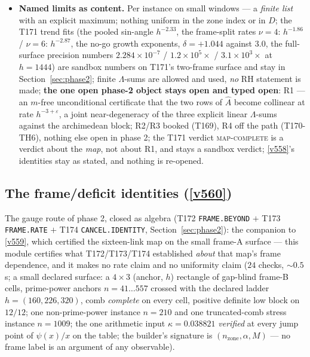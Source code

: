 \documentclass[11pt,a4paper]{article}
\begin{document}
\begin{itemize}[leftmargin=1.5em]
wrong Thomson entry, the off-by-one swap, the wrong polarisation coefficient --- the
$10^{-2}$ bar missed by orders).
\item \textbf{Named limits as content.} Per instance on small windows --- a \emph{finite
list} with an explicit maximum; nothing uniform in the zone index or in $D$; the T171
trend fits (the pooled sin-angle $h^{-2.33}$, the frame-split rates $\nu=4$:
$h^{-1.86}$ / $\nu=6$: $h^{-2.87}$, the no-go growth exponents, $\delta=+1.044$ against
$3.0$, the full-surface precision numbers $2.284\times10^{-7}$ / $1.2\times10^{5}\times$
/ $3.1\times10^{3}\times$ at $h=1444$) are sandbox numbers on T171's two-frame surface
and stay in Section~\ref{sec:phase2}; finite $\Lambda$-sums are allowed and used,
\emph{no} RH statement is made; \textbf{the one open phase-2 object stays open and typed
open}: R1 --- an $m$-free unconditional certificate that the two rows of $\hat A$ become
collinear at rate $h^{-3+\varepsilon}$, a joint near-degeneracy of the three explicit
linear $\Lambda$-sums against the archimedean block; R2/R3 booked (T169), R4 off the
path (T170-TH6), nothing else open in phase 2; the T171 verdict \textsc{map-complete}
is a verdict about the \emph{map}, not about R1, and stays a sandbox verdict;
\vref{v558}'s identities stay as stated, and nothing is re-opened.
\end{itemize}

\subsection{The frame/deficit identities (\texorpdfstring{\vref{v560}}{v560})}\label{sec:v560}
The gauge route of phase 2, closed as algebra (T172 \texttt{FRAME.BEYOND} $+$ T173
\texttt{FRAME.RATE} $+$ T174 \texttt{CANCEL.IDENTITY}, Section~\ref{sec:phase2}): the
companion to \vref{v559}, which certified the sixteen-link map on the small frame-A
surface --- this module certifies what T172/T173/T174 established \emph{about} that map's
frame dependence, and it makes no rate claim and no uniformity claim
 ($24$ checks, ${\sim}0.5$\,s; a small declared
surface: a $4\times3$ (anchor, $h$) rectangle of gap-blind frame-B cells, prime-power
anchors $n=41\ldots557$ crossed with the declared ladder $h=(160,226,320)$, comb
\emph{complete} on every cell, positive definite low block on $12/12$; one
non-prime-power instance $n=210$ and one truncated-comb stress instance $n=1009$; the one
arithmetic input $\kappa=0.038821$ \emph{verified} at every jump point of $\psi(x)/x$ on
the table; the builder's signature is $(n_{\mathrm{zone}},\alpha,M)$ --- no frame label
is an argument of any observable).
\end{document}
